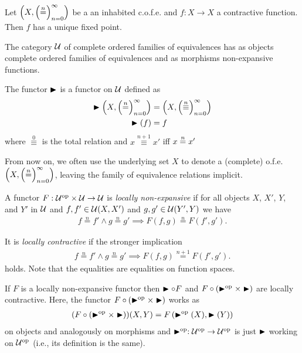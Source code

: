 \documentclass[format=acmsmall, review=true, screen=true]{acmart}
\newcommand{\nequal}[1][n]{\stackrel{\tiny{#1}}{=}}
\begin{document}
\begin{theorem}
  \label{thm:banach-fixed-point}
  Let $\left(X, \seqn{\nequal}\right)$ be a an inhabited c.o.f.e. and $f : X \to X$ a contractive
  function. Then $f$ has a unique fixed point.
\end{theorem}

\begin{definition}
  The category $\mathcal{U}$ of complete ordered families of equivalences has as objects complete
  ordered families of equivalences and as morphisms non-expansive functions.
\end{definition}

\begin{definition}
  \label{def:later-functor}
  The functor $\blacktriangleright$ is a functor on $\mathcal{U}$ defined as
  \begin{align*}
    \Later\left(X, \seqn{\nequal}\right) &= \left(X,
          \seqn{\overset{n}{\equiv}}\right)\\
    \Later(f) &= f
  \end{align*}
  where $\overset{0}{\equiv}$ is the total relation and $x \overset{n+1}{\equiv} x'$
  iff $x \nequal x'$
\end{definition}

From now on, we often use the underlying set $X$ to denote a (complete) o.f.e. $\left(X,
  \seqn{\nequal}\right)$, leaving the family of equivalence
relations implicit.

\begin{definition}
 \label{def:nonexpansive-loc-contractive-functor}
 A functor $F : \mathcal{U}^{\text{op}} \times \mathcal{U} \to \mathcal{U}$ is \emph{locally non-expansive}  if for all
 objects $X$, $X'$, $Y$, and $Y'$ in $\mathcal{U}$ and
 $f, f' \in \mathcal{U}(X,X')$ and $g, g' \in \mathcal{U}(Y',Y)$ we have
 \begin{align*}
   f \overset{n}{=} f' \land g \overset{n}{=} g' \implies F(f, g) \overset{n}{=} F(f', g').
 \end{align*}

 It is \emph{locally contractive} if the stronger implication
 \begin{align*}
   f \overset{n}{=} f' \land g \overset{n}{=} g' \implies F(f, g) \overset{n+1}{=} F(f', g').
 \end{align*}
 holds. Note that the equalities are equalities on function spaces.
\end{definition}

\begin{proposition}
  \label{prop:loc-nonexp-loc-contr}
  If $F$ is a locally non-expansive functor then $\blacktriangleright \circ F$ and $F \circ \left(\blacktriangleright^{\text{op}}
  \times \blacktriangleright\right)$ are locally contractive. Here, the functor $F \circ \left(\blacktriangleright^{\text{op}} \times
  \blacktriangleright\right)$ works as
  \begin{align*}
    (F \circ (\blacktriangleright^{\text{op}} \times \blacktriangleright))(X, Y) = F\left(\blacktriangleright^{\text{op}}(X), \blacktriangleright(Y)\right)
  \end{align*}
  on objects and analogously on morphisms and
  $\blacktriangleright^{\text{op}} : \mathcal{U}^{\text{op}} \to \mathcal{U}^{\text{op}}$ is just $\blacktriangleright$ working on $\mathcal{U}^{\text{op}}$ (i.e., its
  definition is the same).
\end{proposition}
\end{document}
